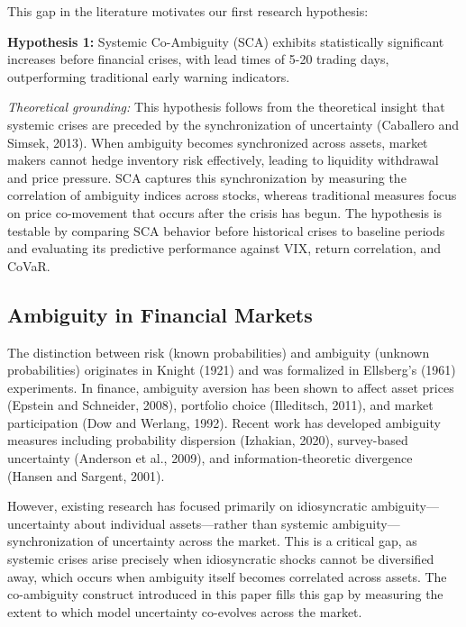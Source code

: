 \documentclass[preprint,12pt,authoryear]{elsarticle}
\begin{document}
This gap in the literature motivates our first research hypothesis:

\begin{center}
\textbf{Hypothesis 1:} Systemic Co-Ambiguity (SCA) exhibits statistically significant increases before financial crises, with lead times of 5-20 trading days, outperforming traditional early warning indicators.
\end{center}

\noindent
\textit{Theoretical grounding:} This hypothesis follows from the theoretical insight that systemic crises are preceded by the synchronization of uncertainty (Caballero and Simsek, 2013). When ambiguity becomes synchronized across assets, market makers cannot hedge inventory risk effectively, leading to liquidity withdrawal and price pressure. SCA captures this synchronization by measuring the correlation of ambiguity indices across stocks, whereas traditional measures focus on price co-movement that occurs after the crisis has begun. The hypothesis is testable by comparing SCA behavior before historical crises to baseline periods and evaluating its predictive performance against VIX, return correlation, and CoVaR.

\subsection{Ambiguity in Financial Markets}

The distinction between risk (known probabilities) and ambiguity (unknown probabilities) originates in Knight (1921) and was formalized in Ellsberg's (1961) experiments. In finance, ambiguity aversion has been shown to affect asset prices (Epstein and Schneider, 2008), portfolio choice (Illeditsch, 2011), and market participation (Dow and Werlang, 1992). Recent work has developed ambiguity measures including probability dispersion (Izhakian, 2020), survey-based uncertainty (Anderson et al., 2009), and information-theoretic divergence (Hansen and Sargent, 2001).

However, existing research has focused primarily on idiosyncratic ambiguity—uncertainty about individual assets—rather than systemic ambiguity—synchronization of uncertainty across the market. This is a critical gap, as systemic crises arise precisely when idiosyncratic shocks cannot be diversified away, which occurs when ambiguity itself becomes correlated across assets. The co-ambiguity construct introduced in this paper fills this gap by measuring the extent to which model uncertainty co-evolves across the market.
\end{document}
